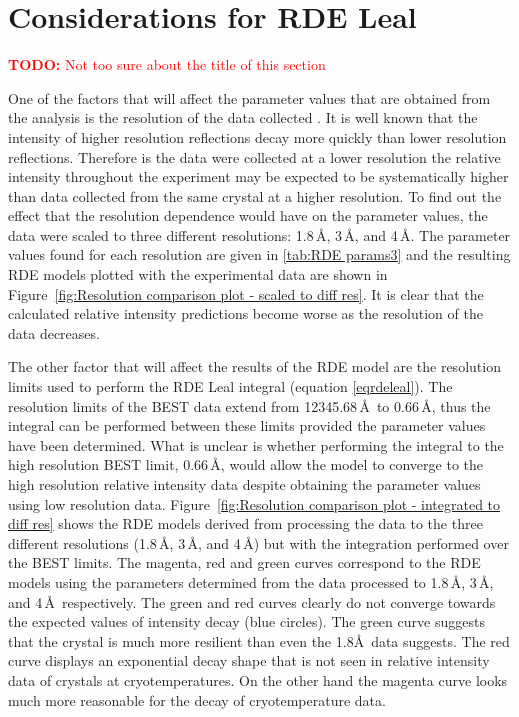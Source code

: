 \section{Considerations for RDE Leal}
\label{sec:Considerations for RDE Leal}
\textcolor{red}{
    \begin{myenumerate}
        \item \hypertarget{todo:new title?}{\textbf{TODO:} Not too sure about the title of this section}
    \end{myenumerate}
}
One of the factors that will affect the parameter values that are obtained from the analysis is the resolution of the data collected \cite{leal2012}.
It is well known that the intensity of higher resolution reflections decay more quickly than lower resolution reflections.
Therefore is the data were collected at a lower resolution the relative intensity throughout the experiment may be expected to be systematically higher than data collected from the same crystal at a higher resolution.
To find out the effect that the resolution dependence would have on the parameter values, the data were scaled to three different resolutions: 1.8\,\AA, 3\,\AA, and 4\,\AA.
The parameter values found for each resolution are given in \ref{tab:RDE params3} and the resulting RDE models plotted with the experimental data are shown in Figure~\ref{fig:Resolution comparison plot - scaled to diff res}.
It is clear that the calculated relative intensity predictions become worse as the resolution of the data decreases.

The other factor that will affect the results of the RDE model are the resolution limits used to perform the RDE Leal integral (equation \ref{eqrdeleal}).
The resolution limits of the BEST data extend from 12345.68\,\AA\ to 0.66\,\AA, thus the integral can be performed between these limits provided the parameter values have been determined.
What is unclear is whether performing the integral to the high resolution BEST limit, 0.66\,\AA, would allow the model to converge to the high resolution relative intensity data despite obtaining the parameter values using low resolution data.
Figure~\ref{fig:Resolution comparison plot - integrated to diff res} shows the RDE models derived from processing the data to the three different resolutions (1.8\,\AA, 3\,\AA, and 4\,\AA) but with the integration performed over the BEST limits.
The magenta, red and green curves correspond to the RDE models using the parameters determined from the data processed to 1.8\,\AA, 3\,\AA, and 4\,\AA\ respectively.
The green and red curves clearly do not converge towards the expected values of intensity decay (blue circles).
The green curve suggests that the crystal is much more resilient than even the 1.8\AA\ data suggests.
The red curve displays an exponential decay shape that is not seen in relative intensity data of crystals at cryotemperatures.
On the other hand the magenta curve looks much more reasonable for the decay of cryotemperature data.

